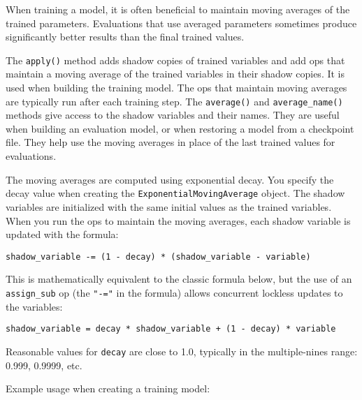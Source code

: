 When training a model, it is often beneficial to maintain moving
averages of the trained parameters. Evaluations that use averaged
parameters sometimes produce significantly better results than the final
trained values.

The \texttt{apply()} method adds shadow copies of trained variables and
add ops that maintain a moving average of the trained variables in their
shadow copies. It is used when building the training model. The ops that
maintain moving averages are typically run after each training step. The
\texttt{average()} and \texttt{average\_name()} methods give access to
the shadow variables and their names. They are useful when building an
evaluation model, or when restoring a model from a checkpoint file. They
help use the moving averages in place of the last trained values for
evaluations.

The moving averages are computed using exponential decay. You specify
the decay value when creating the \texttt{ExponentialMovingAverage}
object. The shadow variables are initialized with the same initial
values as the trained variables. When you run the ops to maintain the
moving averages, each shadow variable is updated with the formula:

\texttt{shadow\_variable\ -=\ (1\ -\ decay)\ *\ (shadow\_variable\ -\ variable)}

This is mathematically equivalent to the classic formula below, but the
use of an \texttt{assign\_sub} op (the \texttt{"-="} in the formula)
allows concurrent lockless updates to the variables:

\texttt{shadow\_variable\ =\ decay\ *\ shadow\_variable\ +\ (1\ -\ decay)\ *\ variable}

Reasonable values for \texttt{decay} are close to 1.0, typically in the
multiple-nines range: 0.999, 0.9999, etc.

Example usage when creating a training model:

